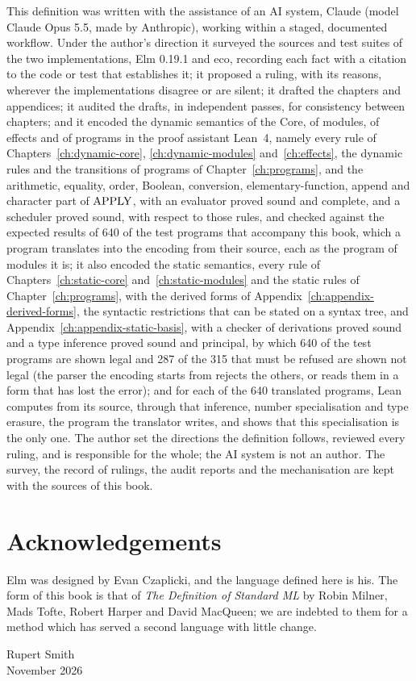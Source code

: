 This definition was written with the assistance of an AI system, Claude
(model Claude Opus 5.5, made by Anthropic), working within a staged,
documented workflow. Under the author's direction it surveyed the sources
and test suites of the two implementations, Elm 0.19.1 and eco, recording
each fact with a citation to the code or test that establishes it; it
proposed a ruling, with its reasons, wherever the implementations disagree
or are silent; it drafted the chapters and appendices; it audited the
drafts, in independent passes, for consistency between chapters; and it
encoded the dynamic semantics of the Core, of modules, of effects and of
programs in the proof assistant Lean~4, namely every rule of
Chapters~\ref{ch:dynamic-core}, \ref{ch:dynamic-modules} and~\ref{ch:effects},
the dynamic rules and the transitions of programs of
Chapter~\ref{ch:programs}, and the arithmetic, equality, order, Boolean,
conversion, elementary-function, append and character part of $\mathrm{APPLY}$,
with an evaluator proved sound and complete, and a scheduler proved sound,
with respect to those rules, and checked against the expected results of 640 of the test programs that
accompany this book, which a program translates into the encoding from their
source, each as the program of modules it is; it also encoded the static
semantics, every rule of Chapters~\ref{ch:static-core} and~\ref{ch:static-modules}
and the static rules of Chapter~\ref{ch:programs}, with the derived forms of
Appendix~\ref{ch:appendix-derived-forms}, the syntactic restrictions that can be
stated on a syntax tree, and Appendix~\ref{ch:appendix-static-basis}, with a checker
of derivations proved sound and a type inference proved sound and principal, by
which 640 of the test programs are shown legal and 287 of the 315 that must be
refused are shown not legal (the parser the encoding starts from rejects the
others, or reads them in a form that has lost the error); and for each of the
640 translated programs, Lean computes from its source, through that inference,
number specialisation and type erasure, the program the translator writes, and
shows that this specialisation is the only one. The author set the directions the
definition follows, reviewed every ruling, and is responsible for the
whole; the AI system is not an author. The survey, the record of rulings,
the audit reports and the mechanisation are kept with the sources of this
book.

\section*{Acknowledgements}

Elm was designed by Evan Czaplicki, and the language defined here is his.
The form of this book is that of \emph{The Definition of Standard ML} by
Robin Milner, Mads Tofte, Robert Harper and David MacQueen; we are indebted
to them for a method which has served a second language with little change.

\bigskip
\begin{flushright}
Rupert Smith\\[2ex]
November 2026
\end{flushright}
